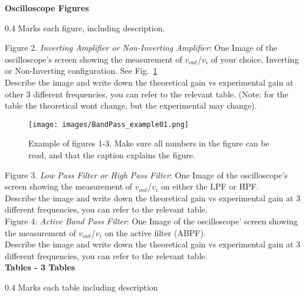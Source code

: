 \documentclass[journal]{IEEEtran}
\begin{document}
{\bf Oscilloscope Figures}  
\begin{flushright} 0.4 Marks each figure, including description. \end{flushright}
Figure 2. {\it Inverting Amplifier or Non-Inverting Amplifier}: One Image of the oscilloscope's screen showing the measurement of $v_{out}$/$v_i$ of your choice, Inverting or Non-Inverting configuration.  See Fig.~\ref{fig:oscilloscope} \\
Describe the image and write down the theoretical gain vs experimental gain at other 3 different frequencies, you can refer to the relevant table. (Note: for the table the theoretical wont change, but the experimental may change).\\

\begin{figure}[H]%
\begin {center}
\texttt{[image: images/BandPass\_example01.png]}
\caption{Example of figures 1-3. Make sure all numbers in the figure can be read, and that the caption explains the figure.}
\label{fig:oscilloscope}
\end {center}
\end{figure}

Figure 3. {\it Low Pass Filter or High Pass Filter}: One Image of the oscilloscope's screen showing the measurement of $v_{out}$/$v_i$ on either the LPF or HPF.\\
Describe the image and write down the theoretical gain vs experimental gain at 3 different frequencies, you can refer to the relevant table. \\

Figure 4: {\it Active Band Pass Filter}: One Image of the oscilloscope' screen showing the measurement of $v_{out}$/$v_i$ on the active filter (ABPF).\\
Describe the image and write down the theoretical gain vs experimental gain at 3 different frequencies, you can refer to the relevant table.\\


{\bf Tables - 3 Tables}
\begin{flushright} 0.4 Marks each table including description\end{flushright}
\end{document}
